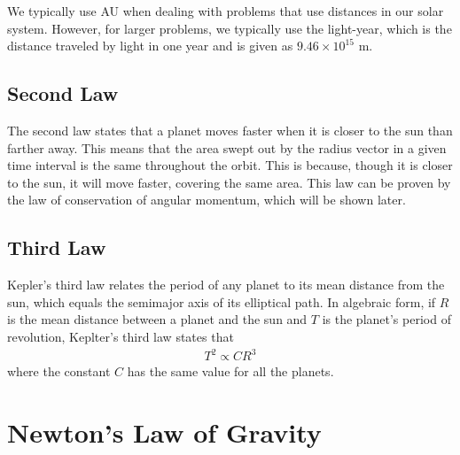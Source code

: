 \documentclass[11pt]{article}
\begin{document}
We typically use AU when dealing with problems that use distances in our solar system. However, for larger problems, we typically use the light-year, which is the distance traveled by light in one year and is given as $9.46\times 10^{15}$ m.

\subsection{Second Law}

The second law states that a planet moves faster when it is closer to the sun than farther away. This means that the area swept out by the radius vector in a given time interval is the same throughout the orbit. This is because, though it is closer to the sun, it will move faster, covering the same area. This law can be proven by the law of conservation of angular momentum, which will be shown later.

\subsection{Third Law}

Kepler's third law relates the period of any planet to its mean distance from the sun, which equals the semimajor axis of its elliptical path. In algebraic form, if $R$ is the mean distance between a planet and the sun and $T$ is the planet's period of revolution, Keplter's third law states that
\begin{align*}
    T^2 \propto CR^3
\end{align*}
where the constant $C$ has the same value for all the planets. 

\section{Newton's Law of Gravity}
\end{document}
